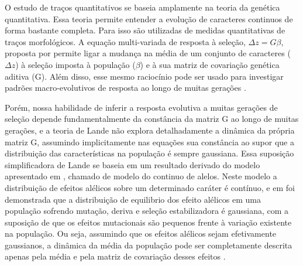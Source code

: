 \documentclass[a4paper, 12pt, titlepage, onecolumn]{article}
\numberwithin{equation}{section}
\numberwithin{table}{section}
\begin{document}
O estudo de traços quantitativos se baseia amplamente na teoria da
genética quantitativa. Essa teoria permite entender a evolução de
caracteres continuos de forma bastante completa. Para isso são
utilizadas de medidas quantitativas de traços morfológicos. A equação
multi-variada de resposta à seleção, $\Delta z = G \beta$, proposta por
\cite{Lande1979} permite ligar a mudança na média de um conjunto de
caracteres ($\Delta z$) à seleção imposta à população ($\beta$) e à sua
matriz de covariação genética aditiva (G). Além disso, esse mesmo
raciocínio pode ser usado para investigar padrões macro-evolutivos de
resposta ao longo de muitas gerações \citep{Lande1983, Marroig2004,
Marroig2005}.  

Porém, nossa habilidade de inferir a resposta evolutiva a muitas
gerações de seleção depende fundamentalmente da constância da matriz G
ao longo de muitas gerações, e a teoria de Lande não explora
detalhadamente a dinâmica da própria matriz G, assumindo implicitamente
nas equações sua constância ao supor que a distribuição das
características na população é sempre gaussiana.  Essa suposição
simplificadora de Lande se baseia em um resultado derivado do modelo
apresentado em \cite{Crow1964}, chamado de modelo do continuo de alelos.
Neste modelo a distribuição de efeitos alélicos sobre um determinado
caráter é contínuo, e em \cite{Kimura1965} foi demonstrada que a
distribuição de equilibrio dos efeito alélicos em uma população sofrendo
mutação, deriva e seleção estabilizadora é gaussiana, com a suposição de
que os efeitos mutacionais são pequenos frente à variação existente na
população. Ou seja, assumindo que os efeitos alélicos sejam efetivamente
gaussianos, a dinâmica da média da população pode ser completamente
descrita apenas pela média e pela matriz de covariação desses efeitos
\citep{Barton1987}. 
\end{document}
